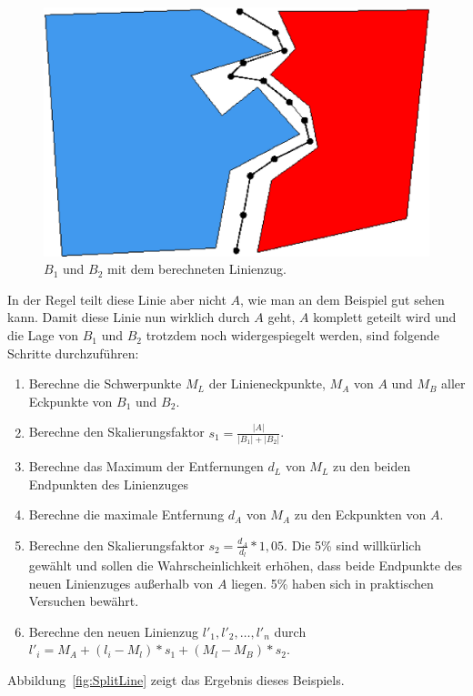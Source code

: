 \begin{figure}
	\centering
	\includegraphics[scale=0.6]{MittelpunktLinie.eps}
	\caption{$B_1$ und $B_2$ mit dem berechneten Linienzug.}
	\label{fig:MittelpunktLinie}
\end{figure}

In der Regel teilt diese Linie aber nicht $A$, wie man an dem Beispiel gut sehen kann. Damit diese Linie nun wirklich durch $A$ geht, $A$ komplett geteilt wird und die Lage von $B_1$ und $B_2$ trotzdem noch widergespiegelt werden, sind folgende Schritte durchzuführen:

\begin{enumerate}
\item Berechne die Schwerpunkte $M_L$ der Linieneckpunkte, $M_A$ von $A$ und $M_B$ aller Eckpunkte von $B_1$ und $B_2$.
\item Berechne den Skalierungsfaktor $s_1=\frac{|A|}{|B_1|+|B_2|}$. 
\item Berechne das Maximum der Entfernungen $d_L$ von $M_L$ zu den beiden Endpunkten des Linienzuges 
\item Berechne die maximale Entfernung $d_A$ von $M_A$ zu den Eckpunkten von $A$.
\item Berechne den Skalierungsfaktor $s_2=\frac{d_A}{d_l} * 1,05$. Die 5\% sind willkürlich gewählt und sollen die Wahrscheinlichkeit erhöhen, dass beide Endpunkte des neuen Linienzuges außerhalb von $A$ liegen. 5\% haben sich in praktischen Versuchen bewährt.
\item Berechne den neuen Linienzug $l'_1,l'_2,\hdots ,l'_n$ durch $l'_i=M_A+(l_i-M_l)*s_1+(M_l-M_B)*s_2$.
\end{enumerate}


Abbildung~\vref{fig:SplitLine} zeigt das Ergebnis dieses Beispiels. 

